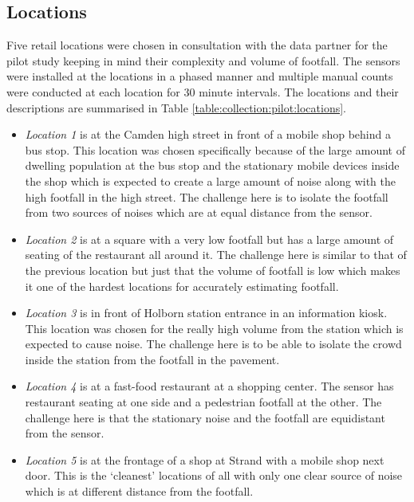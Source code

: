 \subsection{Locations}

Five retail locations were chosen in consultation with the data partner for the pilot study keeping in mind their complexity and volume of footfall.
The sensors were installed at the locations in a phased manner and multiple manual counts were conducted at each location for 30 minute intervals.
The locations and their descriptions are summarised in Table \ref{table:collection:pilot:locations}.

\begin{itemize}
  \item \textit{Location 1} is at the Camden high street in front of a mobile shop behind a bus stop. This location was chosen specifically because of the large amount of dwelling population at the bus stop and the stationary mobile devices inside the shop which is expected to create a large amount of noise along with the high footfall in the high street. The challenge here is to isolate the footfall from two sources of noises which are at equal distance from the sensor.
  \item \textit{Location 2} is at a square with a very low footfall but has a large amount of seating of the restaurant all around it. The challenge here is similar to that of the previous location but just that the volume of footfall is low which makes it one of the hardest locations for accurately estimating footfall.
  \item \textit{Location 3} is in front of Holborn station entrance in an information kiosk. This location was chosen for the really high volume from the station which is expected to cause noise. The challenge here is to be able to isolate the crowd inside the station from the footfall in the pavement.
  \item \textit{Location 4} is at a fast-food restaurant at a shopping center. The sensor has restaurant seating at one side and a pedestrian footfall at the other. The challenge here is that the stationary noise and the footfall are equidistant from the sensor.
  \item \textit{Location 5} is at the frontage of a shop at Strand with a mobile shop next door. This is the `cleanest' locations of all with only one clear source of noise which is at different distance from the footfall.
\end{itemize}

